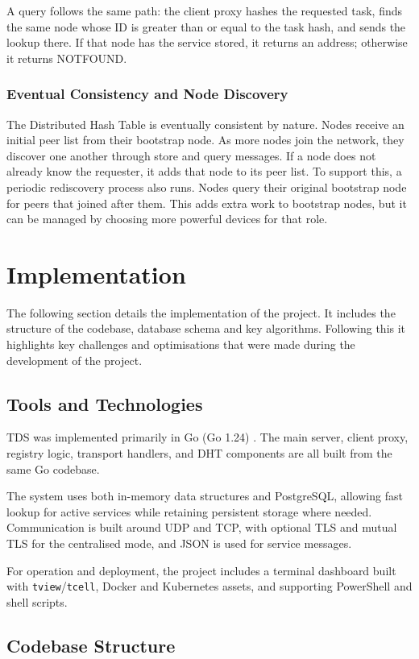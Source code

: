 \documentclass[10pt,a4paper]{article}
\begin{document}
A query follows the same path: the client proxy hashes the requested task, finds the same node whose ID is greater than or equal to the task hash, and sends the lookup there. If that node has the service stored, it returns an address; otherwise it returns NOTFOUND.
\subsubsection{Eventual Consistency and Node Discovery}
The Distributed Hash Table is eventually consistent by nature. Nodes receive an initial peer list from their bootstrap node. As more nodes join the network, they discover one another through store and query messages. If a node does not already know the requester, it adds that node to its peer list.
To support this, a periodic rediscovery process also runs. Nodes query their original bootstrap node for peers that joined after them. This adds extra work to bootstrap nodes, but it can be managed by choosing more powerful devices for that role.

\section{Implementation}
The following section details the implementation of the project. It includes the structure of the codebase, database schema and key algorithms. Following this it highlights key challenges and optimisations that were made during the development of the project.
\subsection{Tools and Technologies}

TDS was implemented primarily in Go (Go 1.24) \cite{golang}. The main server, client proxy, registry logic, transport handlers, and DHT components are all built from the same Go codebase.

The system uses both in-memory data structures and PostgreSQL, allowing fast lookup for active services while retaining persistent storage where needed. Communication is built around UDP and TCP, with optional TLS and mutual TLS for the centralised mode, and JSON is used for service messages.

For operation and deployment, the project includes a terminal dashboard built with \texttt{tview}/\texttt{tcell}, Docker and Kubernetes assets, and supporting PowerShell and shell scripts.

\subsection{Codebase Structure}
\end{document}
